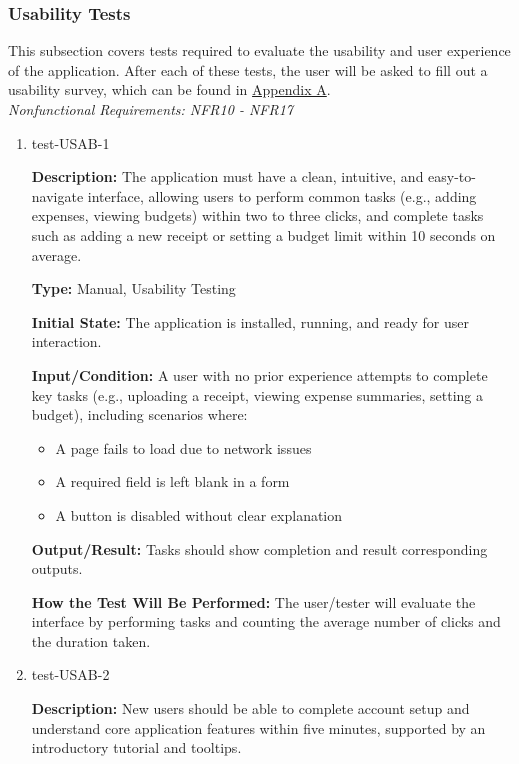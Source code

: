 \documentclass[12pt, titlepage]{article}
\begin{document}
\subsubsection{Usability Tests}

This subsection covers tests required to evaluate the usability and user
experience of the application. After each of these tests, the user will be asked
to fill out a usability survey, which can be found in \hyperref[appx.a]{Appendix
A}.\\

\textit{Nonfunctional Requirements: NFR10 - NFR17}

\begin{enumerate}

\item{test-USAB-1\\}

\textbf{Description:} The application must have a clean, intuitive, and
easy-to-navigate interface, allowing users to perform common tasks (e.g., adding
expenses, viewing budgets) within two to three clicks, and complete tasks such
as adding a new receipt or setting a budget limit within 10 seconds on average.

\textbf{Type:} Manual, Usability Testing
					
\textbf{Initial State:} The application is installed, running, and ready for user interaction.
					
\textbf{Input/Condition:} A user with no prior experience attempts to complete key tasks (e.g., uploading a receipt, viewing expense summaries, setting a budget), 
including scenarios where:
  \begin{itemize}
      \item A page fails to load due to network issues
      \item A required field is left blank in a form
      \item A button is disabled without clear explanation
  \end{itemize}
					
\textbf{Output/Result:} Tasks should show completion and result corresponding
outputs.
					
\textbf{How the Test Will Be Performed:} The user/tester will evaluate the
interface by performing tasks and counting the average number of clicks and the
duration taken.

\item{test-USAB-2\\}

\textbf{Description:} New users should be able to complete account setup and
understand core application features within five minutes, supported by an
introductory tutorial and tooltips.


\end{enumerate}
\end{document}
